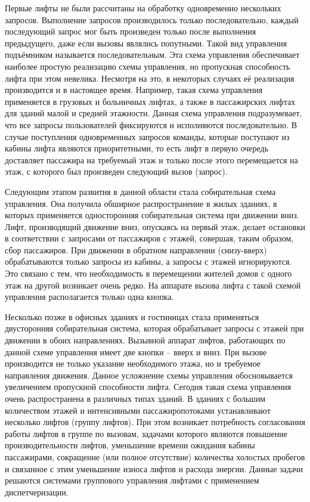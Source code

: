 	Первые лифты не были рассчитаны на обработку одновременно нескольких запросов.
		Выполнение запросов производилось только последовательно, каждый последующий запрос
		мог быть произведен только после выполнения предыдущего, даже если вызовы являлись попутными.
		Такой вид управления подъёмником называется последовательным.
		Эта схема управления обеспечивает наиболее простую реализацию схемы управления,
		но пропускная способность лифта при этом невелика. Несмотря на это,
		в некоторых случаях её реализация производится и в настоящее время.
		Например, такая схема управления применяется в грузовых и больничных лифтах,
		а также в пассажирских лифтах для зданий малой и средней этажности.
		Данная схема управления подразумевает, что все запросы пользователей
		фиксируются и исполняются последовательно. В случае поступления одновременных
		запросов команды, которые поступают из кабины лифта являются приоритетными,
		то есть лифт в первую очередь доставляет пассажира на требуемый этаж и только
		после этого перемещается на этаж, с которого был произведен следующий вызов (запрос).

	Следующим этапом развития в данной области стала собирательная схема управления.
		Она получила обширное распространение в жилых зданиях, в которых применяется
		односторонняя собирательная система при движении вниз. Лифт, производящий движение вниз,
		опускаясь на первый этаж, делает остановки в соответствии с запросами от пассажиров с этажей,
		совершая, таким образом, сбор пассажиров. При движении в обратном направлении (снизу-вверх)
		обрабатываются только запросы из кабины, а запросы с этажей игнорируются. Это связано с тем,
		что необходимость в перемещении жителей домов с одного этаж на другой возникает очень редко.
		На аппарате вызова лифта с такой схемой управления располагается только одна кнопка.

	Несколько позже в офисных зданиях и гостиницах стала применяться двусторонняя собирательная система,
		которая обрабатывает запросы с этажей при движении в обоих направлениях. Вызывной аппарат лифтов,
		работающих по данной схеме управления имеет две кнопки – вверх и вниз.
		При вызове производится не только указание необходимого этажа, но и требуемое направления движения.
		Данное усложнение схемы управления обосновывается увеличением пропускной способности лифта.
		Сегодня такая схема управления очень распространена в различных типах зданий.
		В зданиях с большим количеством этажей и интенсивными пассажиропотоками устанавливают
		несколько лифтов (группу лифтов). При этом возникает потребность согласования работы
		лифтов в группе по вызовам, задачами которого являются повышение производительности лифтов,
		уменьшение времени ожидания кабины пассажирами, сокращение (или полное отсутствие)
		количества холостых пробегов и связанное с этим уменьшение износа лифтов и расхода энергии.
		Данные задачи решаются системами группового управления лифтами с применением диспетчеризации.

